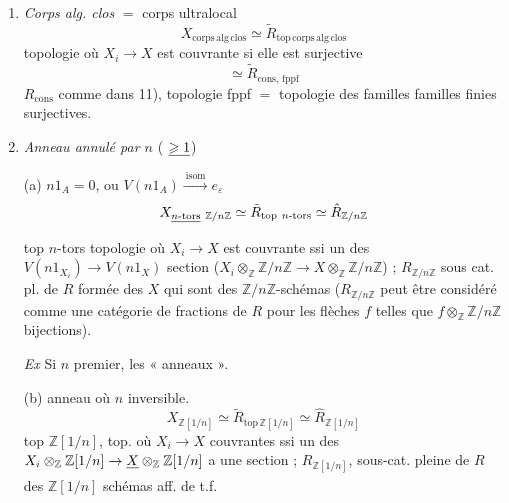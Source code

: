 \documentclass[11pt,a4paper]{article}
\begin{document}
\begin{enumerate}
  \item[15)] \emph{Corps alg. clos} $=$ corps \struck{\ill{}} ultralocal
    \[
      X_{\mathrm{corps\,alg\,clos}} \simeq
      \tilde{R}_{\mathrm{top\,corps\,alg\,clos}}
    \]
    topologie où $X_{i} \to X$ est couvrante si elle est surjective
    \[
      \simeq \tilde{R}_{\mathrm{cons},\,\mathrm{fppf}}
    \]
    $R_{\mathrm{cons}}$ comme dans 11), topologie fppf $=$ topologie des
    familles   familles
    finies surjectives.
  \item[16)] \emph{Anneau \struck{\ill{}} annulé par $n$}
    (\struck{\ill{}} $\uncertain{\geqslant 1}$)

    (a) $n 1_{A} = 0$, ou $V(n 1_{A}) \xrightarrow{\ \mathrm{isom}\ }
    e_{\varepsilon}$
    \[
      X_{\struck{n\text{-tors}}\ \mathbb{Z}/n\mathbb{Z}}
      \simeq \tilde{R}_{\mathrm{top}\ n\text{-tors}}
      \simeq \hat{R}_{\mathbb{Z}/n\mathbb{Z}}
    \]
    top $n$-tors topologie où $X_{i} \to X$ est couvrante ssi un
    des $V(n 1_{X_{i}}) \to V(n 1_{X})$ \struck{\ill{}}  section
    ($X_{i} \otimes_{\mathbb{Z}} \mathbb{Z}/n\mathbb{Z} \to X
    \otimes_{\mathbb{Z}} \mathbb{Z}/n\mathbb{Z}$) ;
    $R_{\mathbb{Z}/n\mathbb{Z}}$  sous cat. pl. de $R$
    formée des \struck{\ill{}} $X$ qui sont des
    $\mathbb{Z}/n\mathbb{Z}$-schémas ($R_{\mathbb{Z}/n\mathbb{Z}}$ peut
    être considéré comme une catégorie de fractions de $R$ pour les flèches
    $f$ telles que $f \otimes_{\mathbb{Z}} \mathbb{Z}/n\mathbb{Z}$
    bijections).


    \emph{Ex} Si $n$ premier, \ill{} \ill{} les « anneaux  ».

    (b) anneau où $n$ inversible.
    \[
      X_{\mathbb{Z}[1/n]} \simeq \tilde{R}_{\mathrm{top}\,\mathbb{Z}[1/n]}
      \simeq \hat{R}_{\mathbb{Z}[1/n]}
    \]
    top $\mathbb{Z}[1/n]$, top. où $X_{i} \to X$ couvrantes ssi un des
    $X_{i} \otimes_{\mathbb{Z}} \mathbb{Z}[1/n] \to \struck{X}
    \otimes_{\mathbb{Z}} \mathbb{Z}[1/n]$ a une section ;
    $R_{\mathbb{Z}[1/n]}$, sous-cat. pleine de $R$ des $\mathbb{Z}[1/n]$
    schémas aff. de t.f. 


\end{enumerate}
\end{document}
